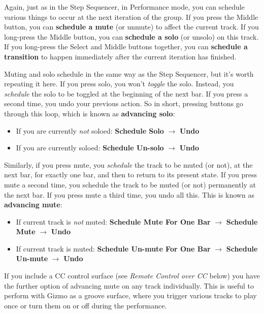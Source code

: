 \documentclass{article}
\begin{document}
Again, just as in the Step Sequencer, in Performance mode, you can schedule various things to occur at the next iteration of the group.  If you press the Middle button, you can {\bf schedule a mute} (or unmute) to affect the current track.  If you long-press the Middle button, you can {\bf schedule a solo} (or unsolo) on this track.  If you long-press the Select and Middle buttons together, you can {\bf schedule a transition} to happen immediately after the current iteration has finished.

Muting and solo schedule in the same way as the Step Sequencer, but it's worth repeating it here. If you press solo, you won't {\it toggle} the solo.  Instead, you {\it schedule} the solo to be toggled at the beginning of the next bar.  If you press a second time, you undo your previous action.  So in short, pressing buttons go through this loop, which is known as {\bf advancing solo}:

\begin{itemize}
\item If you are currently {\it not} soloed: {\bf Schedule Solo} \(\rightarrow\) {\bf Undo}
\item If you are currently soloed: {\bf Schedule Un-solo} \(\rightarrow\) {\bf Undo}
\end{itemize}

Similarly, if you press mute, you {\it schedule} the track to be muted (or not), at the next bar, for exactly one bar, and then to return to its present state.  If you press mute a second time, you schedule the track to be muted (or not) permanently at the next bar.  If you press mute a third time, you undo all this.  This is known as {\bf advancing mute}:

\begin{itemize}
\item If current track is {\it not} muted: {\bf Schedule Mute For One Bar} \(\rightarrow\)  {\bf Schedule Mute} \(\rightarrow\) {\bf Undo}
\item If current track is muted: {\bf Schedule Un-mute For One Bar} \(\rightarrow\)  {\bf Schedule Un-mute} \(\rightarrow\) {\bf Undo}
\end{itemize}

If you include a CC control surface (see {\it Remote Control over CC} below) you have the further option of advancing mute on any track individually.  This is useful to perform with Gizmo as a groove surface, where you trigger various tracks to play once or turn them on or off during the performance.
\end{document}
